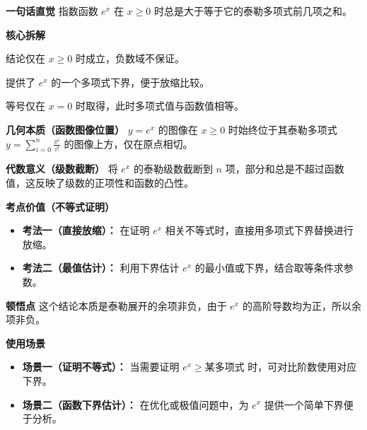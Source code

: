 \begin{explanationbox}
\textbf{\textcolor{CExplanation}{一句话直觉}}
指数函数 $e^x$ 在 $x \geq 0$ 时总是大于等于它的泰勒多项式前几项之和。

\medskip
\textbf{\textcolor{CExplanation}{核心拆解}}
\begin{description}[style=nextline, leftmargin=2.8em, labelsep=0.5em, itemsep=0.45em]
    \item[\textbf{要点一（非负域成立）：}] 结论仅在 $x \geq 0$ 时成立，负数域不保证。
    \item[\textbf{要点二（多项式下界）：}] 提供了 $e^x$ 的一个多项式下界，便于放缩比较。
    \item[\textbf{要点三（取等唯一）：}] 等号仅在 $x=0$ 时取得，此时多项式值与函数值相等。
\end{description}

\medskip
\textbf{\textcolor{CExplanation}{几何本质（函数图像位置）}}
$y = e^x$ 的图像在 $x \geq 0$ 时始终位于其泰勒多项式 $y = \sum_{i=0}^{n} \frac{x^i}{i!}$ 的图像上方，仅在原点相切。

\medskip
\textbf{\textcolor{CExplanation}{代数意义（级数截断）}}
将 $e^x$ 的泰勒级数截断到 $n$ 项，部分和总是不超过函数值，这反映了级数的正项性和函数的凸性。

\medskip
\textbf{\textcolor{CExplanation}{考点价值（不等式证明）}}
\begin{itemize}[leftmargin=*, itemsep=0.5em, topsep=0.4em]
    \item \textbf{考法一（直接放缩）：} 在证明 $e^x$ 相关不等式时，直接用多项式下界替换进行放缩。
    \item \textbf{考法二（最值估计）：} 利用下界估计 $e^x$ 的最小值或下界，结合取等条件求参数。
\end{itemize}

\medskip
\textbf{\textcolor{CExplanation}{顿悟点}}
这个结论本质是泰勒展开的余项非负，由于 $e^x$ 的高阶导数均为正，所以余项非负。

\medskip
\textbf{\textcolor{CExplanation}{使用场景}}
\begin{itemize}[leftmargin=*, itemsep=0.5em, topsep=0.4em]
    \item \textbf{场景一（证明不等式）：} 当需要证明 $e^x \geq \text{某多项式}$ 时，可对比阶数使用对应下界。
    \item \textbf{场景二（函数下界估计）：} 在优化或极值问题中，为 $e^x$ 提供一个简单下界便于分析。
\end{itemize}
\end{explanationbox}
